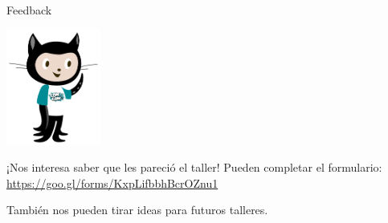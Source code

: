 \begin{frame}{Feedback}

    \begin{center}
        \includegraphics[height=1.5in]{images/octocat-comcom.pdf}
    \end{center}

    \begin{block}{¡Nos interesa saber que les pareció el taller!}
        Pueden completar el formulario: \url{https://goo.gl/forms/KxpLifbbhBcrOZnu1}

        \vspace{0.5em}

        También nos pueden tirar ideas para futuros talleres.
    \end{block}

\end{frame}
